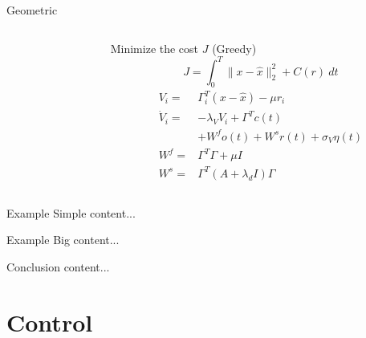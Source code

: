 \documentclass[17pt, t, lualatex]{beamer}
\begin{document}
\begin{frame}{Geometric}
{\begin{columns}[T]
\begin{column}{0.2\textwidth}
		\end{column}
		\begin{column}{0.6\textwidth}
			Minimize the cost $J$ (Greedy)\\
			\begin{equation}
				J = \int_{0}^{T} \|x-\hat{x}\|^2_2 + C(r) \ dt
			\end{equation}
			\begin{equation}
			\begin{aligned}
				V_i=&\Gamma_i^T(x-\hat{x}) - \mu r_i\\
				\dot{V}_i=&-\lambda_V V_i+\Gamma^Tc(t)\\
				&+ W^fo(t) + W^sr(t)+\sigma_V \eta(t)\\
				W^f =& \Gamma^T\Gamma + \mu I\\
				W^s =& \Gamma^T\left(A + \lambda_dI\right)\Gamma
			\end{aligned}
			\end{equation}
		\end{column}
	\end{columns}
	}

\end{frame}



\begin{frame}{Example Simple}
	content...
\end{frame}

\begin{frame}{Example Big}
	content...
\end{frame}

\begin{frame}{Conclusion}
	content...
\end{frame}


\section{Control}\insertsectionpage
\end{document}
